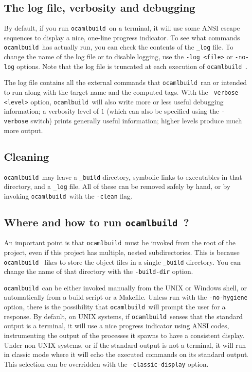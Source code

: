 \documentclass[12pt]{article}
\newcommand{\ocb}{\texttt{ocamlbuild}~}
\begin{document}
\subsection{The log file, verbosity and debugging}
By default, if you run \ocb on a terminal, it will use some ANSI escape sequences
to display a nice, one-line progress indicator.  To see what commands \ocb has actually run,
you can check the contents of the \texttt{\_log} file.  To change the name of the
log file or to disable logging, use the \texttt{-log <file>} or \texttt{-no-log} options.
Note that the log file is truncated at each execution of \ocb.

The log file contains all the external commands that \ocb ran or intended to
run along with the target name and the computed tags.  With the
\texttt{-verbose <level>} option, \ocb will also write more or less useful
debugging information;  a verbosity level of $1$ (which can also be specified
using the \texttt{-verbose} switch) prints generally useful information; higher
levels produce much more output.
\subsection{Cleaning}
\ocb may leave a \texttt{\_build} directory, symbolic links to executables in
that directory, and a \texttt{\_log} file.  All of these can be removed safely
by hand, or by invoking \ocb with the \texttt{-clean} flag.
\subsection{Where and how to run \ocb ?}
An important point is that \ocb must be invoked from the root of the project,
even if this project has multiple, nested subdirectories.  This is because \ocb
likes to store the object files in a single \texttt{\_build} directory.  You
can change the name of that directory with the \texttt{-build-dir} option.

\ocb can be either invoked manually from the UNIX or Windows shell, or
automatically from a build script or a Makefile.  Unless run with the
\texttt{-no-hygiene} option, there is the possibility that \ocb will prompt the
user for a response.  By default, on UNIX systems, if \ocb senses that the
standard output is a terminal, it will use a nice progress indicator using ANSI
codes, instrumenting the output of the processes it spawns to have a consistent
display.  Under non-UNIX systems, or if the standard output is not a terminal,
it will run in classic mode where it will echo the executed commands on its
standard output.  This selection can be overridden with the \texttt{-classic-display} option.
\end{document}
